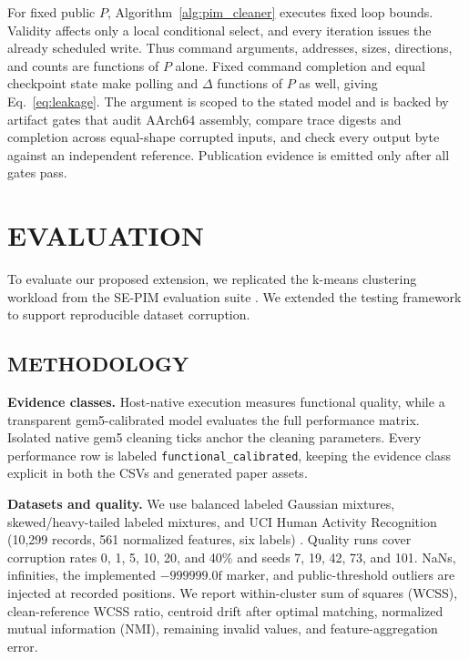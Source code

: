 \documentclass[conference]{IEEEtran}
\newcommand{\sentinel}{-999999.0\mathrm{f}}
\begin{document}
For fixed public $P$, Algorithm~\ref{alg:pim_cleaner} executes fixed loop
bounds. Validity affects only a local conditional select, and every iteration
issues the already scheduled write. Thus command arguments, addresses, sizes,
directions, and counts are functions of $P$ alone. Fixed command completion and
equal checkpoint state make polling and $\Delta$ functions of $P$ as well,
giving Eq.~\eqref{eq:leakage}. The argument is scoped to the stated model and is
backed by artifact gates that audit AArch64 assembly, compare trace digests and
completion across equal-shape corrupted inputs, and check every output byte
against an independent reference. Publication evidence is emitted only after
all gates pass.

\section{EVALUATION}

To evaluate our proposed extension, we replicated the k-means clustering workload from the SE-PIM evaluation suite \cite{Kha:2023}. We extended the testing framework to support reproducible dataset corruption.

\subsection{METHODOLOGY}
\textbf{Evidence classes.} Host-native execution measures functional quality,
while a transparent gem5-calibrated model evaluates the full performance
matrix. Isolated native gem5 cleaning ticks anchor the cleaning parameters.
Every performance row is labeled \texttt{functional\_calibrated}, keeping the
evidence class explicit in both the CSVs and generated paper assets.

\textbf{Datasets and quality.} We use balanced labeled Gaussian mixtures,
skewed/heavy-tailed labeled mixtures, and UCI Human Activity Recognition (10,299
records, 561 normalized features, six labels) \cite{Anguita:2013}. Quality runs
cover corruption rates 0, 1, 5, 10, 20, and 40\% and seeds 7, 19, 42, 73, and
101. NaNs, infinities, the implemented $\sentinel$ marker, and public-threshold
outliers are injected at recorded positions. We report within-cluster sum of
squares (WCSS), clean-reference WCSS ratio, centroid drift after optimal
matching, normalized mutual information (NMI), remaining invalid values, and
feature-aggregation error.

\begin{table}[t]
\caption{Datasets used in the revised quality evaluation.}
\label{tab:datasets}
\centering\scriptsize

\end{table}
\end{document}
